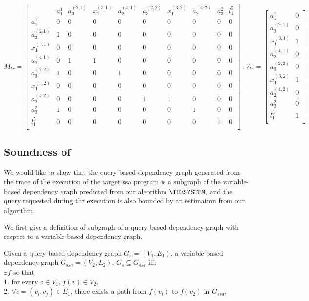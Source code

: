 { \tiny
 \[
M_{tr} =  \left[ \begin{matrix}
 & a_1^{1} & a_3^{(2,1)} & x_1^{(3,1)} & a_2^{(4,1)}  & a_3^{(2,2)} & x_1^{(3,2)} & a_2^{(4,2)} & a_3^{2} & l_1^{5}\\
 a_1^{1} & 0 & 0 & 0 & 0 & 0 & 0 & 0 &0 &0 \\
a_3^{(2,1)} & 1 & 0 & 0 & 0 & 0 & 0 & 0&0&0\\
x_1^{(3,1)} & 0 & 0 & 0 & 0 & 0 & 0& 0& 0 &0\\
a_2^{(4,1)} & 0 & 1 & 1 & 0 & 0 & 0 & 0& 0&0\\
a_3^{(2,2)} & 1 & 0 & 0 & 1 & 0 & 0 & 0 & 0&0 \\
x_1^{(3,2)} & 0 & 0 & 0 & 0 & 0 & 0 & 0& 0&0\\
a_2^{(4,2)} & 0 & 0 & 0 & 0 & 1 & 1 & 0& 0&0\\
a_3^{2} & 1 & 0 & 0 & 0 & 0 & 0 & 1& 0&0\\
l_1^{5} & 0 & 0 & 0 & 0 & 0 & 0 & 0 & 1 &0 \\
 \end{matrix} \right] 
~ , V_{tr} = \left [ \begin{matrix}
a_1^{1} &  0 \\
a_3^{(2,1)} & 0 \\
x_1^{(3,1)} & 1 \\
a_2^{(4,1)} &  0 \\
a_3^{(2,2)} & 0 \\
x_1^{(3,2)} & 1 \\
a_2^{(4,2)} &  0 \\
a_3^{2} &  0 \\
l_1^{5} &  1 \\
\end{matrix} \right ]
\]
}

\subsection{ Soundness of {\THESYSTEM}}
We would like to show that the query-based dependency graph generated from the trace of the execution of the target ssa program is a subgraph of the variable-based dependency graph predicted from our algorithm ${\THESYSTEM}$, and the query requested during the execution is also bounded by an estimation from our algorithm.

We first give a definition of subgraph of a query-based dependency graph with respect to a variable-based dependency graph.
\begin{defn}
[Subgraph]
Given a query-based dependency graph $G_{s} = (V_1, E_1)$, a variable-based dependency graph $G_{ssa} = (V_2, E_2)$, $G_{s} \subseteq G_{ssa}$ iff:\\
$\exists f$ so that \\
1. for every $v \in V_1$, $f(v) \in V_2$. 
\\
2. $\forall e=(v_i, v_j) \in E_1$, there exists a path 
from $f(v_i)$ to $f(v_2)$ in $G_{ssa}$.
\end{defn}

